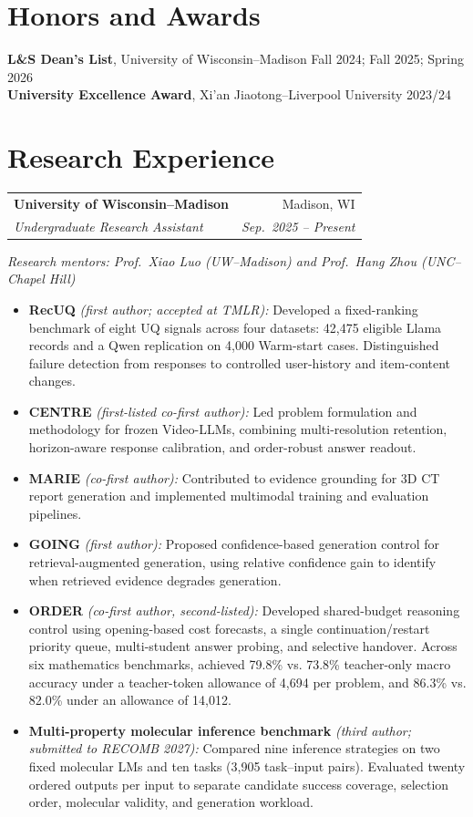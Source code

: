 \documentclass[10pt,a4paper]{article}
\makeatletter
\newcommand{\entry}[4]{%
  \needspace{3\baselineskip}%
  \begin{tabularx}{\linewidth}{@{}Xr@{}}
    \textbf{#1} & #2\\[-1pt]
    \textit{#3} & \textit{#4}
  \end{tabularx}\par
}
\makeatother
\begin{document}
\section{Honors and Awards}
\textbf{L\&S Dean's List}, University of Wisconsin--Madison
\hfill Fall 2024; Fall 2025; Spring 2026\\[3pt]
\textbf{University Excellence Award}, Xi'an Jiaotong--Liverpool University
\hfill 2023/24

\newpage

\section{Research Experience}
\entry{University of Wisconsin--Madison}{Madison, WI}
{Undergraduate Research Assistant}{Sep.\ 2025 -- Present}
{\small\textit{Research mentors: Prof.\ Xiao Luo (UW--Madison) and Prof.\ Hang Zhou (UNC--Chapel Hill)}}\par
\begin{itemize}[topsep=4pt,itemsep=5pt]
  \item \textbf{RecUQ} \textit{(first author; accepted at TMLR):} Developed a fixed-ranking benchmark of eight UQ signals across four datasets: 42,475 eligible Llama records and a Qwen replication on 4,000 Warm-start cases. Distinguished failure detection from responses to controlled user-history and item-content changes.
  \item \textbf{CENTRE} \textit{(first-listed co-first author):} Led problem formulation and methodology for frozen Video-LLMs, combining multi-resolution retention, horizon-aware response calibration, and order-robust answer readout.
  \item \textbf{MARIE} \textit{(co-first author):} Contributed to evidence grounding for 3D CT report generation and implemented multimodal training and evaluation pipelines.
  \item \textbf{GOING} \textit{(first author):} Proposed confidence-based generation control for retrieval-augmented generation, using relative confidence gain to identify when retrieved evidence degrades generation.
  \item \textbf{ORDER} \textit{(co-first author, second-listed):} Developed shared-budget reasoning control using opening-based cost forecasts, a single continuation/restart priority queue, multi-student answer probing, and selective handover. Across six mathematics benchmarks, achieved 79.8\% vs. 73.8\% teacher-only macro accuracy under a teacher-token allowance of 4,694 per problem, and 86.3\% vs. 82.0\% under an allowance of 14,012.
  \item \textbf{Multi-property molecular inference benchmark} \textit{(third author; submitted to RECOMB 2027):} Compared nine inference strategies on two fixed molecular LMs and ten tasks (3,905 task--input pairs). Evaluated twenty ordered outputs per input to separate candidate success coverage, selection order, molecular validity, and generation workload.
\end{itemize}
\end{document}
